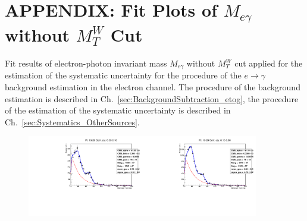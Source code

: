 \section{APPENDIX: Fit Plots of $M_{e\gamma}$ without $M_T^W$ Cut}
\label{sec:EtogammaFitPlotsNoWMtCut}

Fit results of electron-photon invariant mass $M_{e\gamma}$ without $M_T^W$ cut applied for the estimation of the systematic uncertainty for the procedure of the $e \rightarrow \gamma$ background estimation in the electron channel. The procedure of the background estimation is described in Ch.~\ref{sec:BackgroundSubtraction_etog}, the procedure of the estimation of the systematic uncertainty is described in Ch.~\ref{sec:Systematics_OtherSources}.

\begin{figure}[htb]
  \begin{center}
   \includegraphics[width=0.45\textwidth]{../figs/figs_v11/ELECTRON_WGamma/EtoGammaFits/sa_hZmass_h_Data_EtoGamma_Enr_BARREL_pt15to20_ieta0_noWMtCut.pdf}\includegraphics[width=0.45\textwidth]{../figs/figs_v11/ELECTRON_WGamma/EtoGammaFits/sa_hZmass_h_Data_EtoGamma_Enr_BARREL_pt15to20_ieta1_noWMtCut.pdf}\\

\end{center}
\end{figure}
